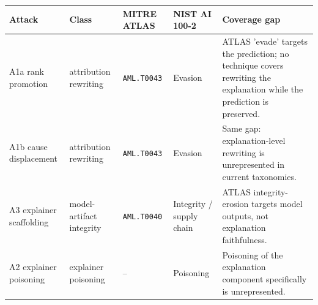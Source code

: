 \begin{tabular}{llllp{4.6cm}}
\toprule
\textbf{Attack} & \textbf{Class} & \textbf{MITRE ATLAS} & \textbf{NIST AI 100-2} & \textbf{Coverage gap} \\
\midrule
A1a rank promotion & attribution rewriting & \texttt{AML.T0043} & Evasion & ATLAS 'evade' targets the prediction; no technique covers rewriting the explanation while the prediction is preserved. \\
A1b cause displacement & attribution rewriting & \texttt{AML.T0043} & Evasion & Same gap: explanation-level rewriting is unrepresented in current taxonomies. \\
A3 explainer scaffolding & model-artifact integrity & \texttt{AML.T0040} & Integrity / supply chain & ATLAS integrity-erosion targets model outputs, not explanation faithfulness. \\
A2 explainer poisoning & explainer poisoning & -- & Poisoning & Poisoning of the explanation component specifically is unrepresented. \\
\bottomrule
\end{tabular}
